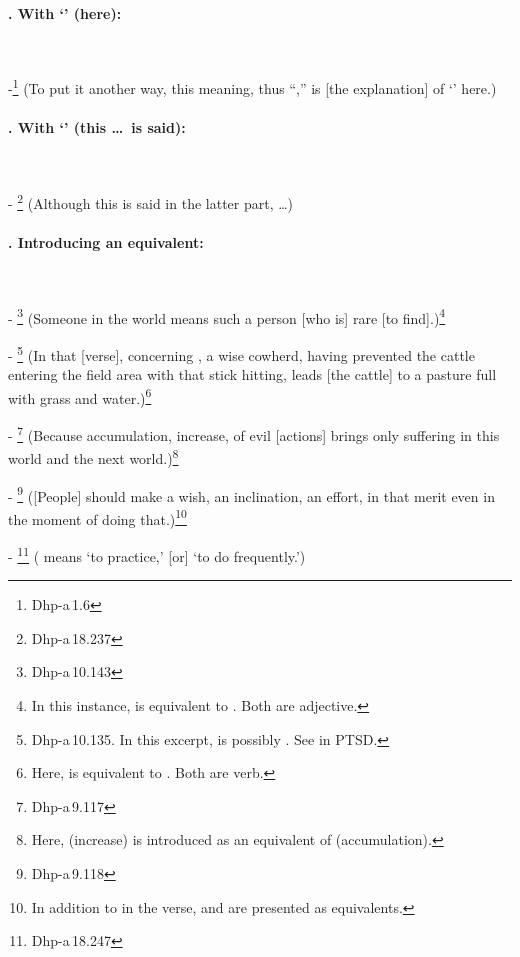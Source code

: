 \paragraph*{. With `' (here):}\ \par
-\footnote{Dhp-a\,1.6} (To put it another way, this meaning, thus ``,'' is [the explanation] of `' here.)\par

\paragraph*{. With `' (this \ldots\ is said):}\ \par
- \footnote{Dhp-a\,18.237} (Although this  is said in the latter part, \ldots)\par

\paragraph*{. Introducing an equivalent:}\ \par
- \footnote{Dhp-a\,10.143} (Someone in the world means such a person [who is] rare [to find].)\footnote{In this instance,  is equivalent to . Both are adjective.}\par
- \footnote{Dhp-a\,10.135. In this excerpt,  is possibly . See  in PTSD.} (In that [verse], concerning , a wise cowherd, having prevented the cattle entering the field area with that stick hitting, leads [the cattle] to a pasture full with grass and water.)\footnote{Here,  is equivalent to . Both are verb.}\par
- \footnote{Dhp-a\,9.117} (Because accumulation, increase, of evil [actions] brings only suffering in this world and the next world.)\footnote{Here,  (increase) is introduced as an equivalent of  (accumulation).}\par
- \footnote{Dhp-a\,9.118} ([People] should make a wish, an inclination, an effort, in that merit even in the moment of doing that.)\footnote{In addition to  in the verse,  and  are presented as equivalents.}\par
- \footnote{Dhp-a\,18.247} ( means `to practice,' [or] `to do frequently.')\par
